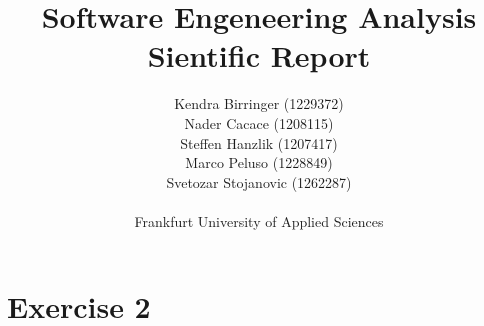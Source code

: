 \documentclass{article}
\begin{document}


\title{Software Engeneering Analysis Sientific Report}

\author{Kendra Birringer (1229372) \\ Nader Cacace (1208115) \\ Steffen Hanzlik (1207417) \\ Marco Peluso (1228849) \\ Svetozar Stojanovic (1262287)\\
\\
Frankfurt University of Applied Sciences \\}


\maketitle              %
\tableofcontents
\listoffigures
\newpage
\section{Exercise 2}
\end{document}
